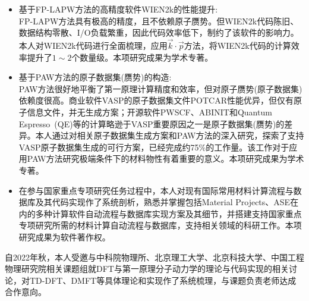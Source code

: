 \begin{itemize}
	\item 基于\textrm{FP-LAPW}方法的高精度软件\textrm{WIEN2k}的性能提升:\\
		\textrm{FP-LAPW}方法具有极高的精度，且不依赖原子赝势。但\textrm{WIEN2k}代码陈旧、数据结构零散、\textrm{I/O}负载繁重，因此代码效率低下，制约了该软件的影响力。本人对\textrm{WIEN2k}代码进行全面梳理，应用$\vec k\cdot\vec p$方法，将\textrm{WIEN2k}代码的计算效率提升了$1\sim2$个数量级。本项研究成果为学术专著。
	\item 基于\textrm{PAW}方法的原子数据集(赝势)的构造:\\
		\textrm{PAW}方法很好地平衡了第一原理计算精度和效率，但对原子赝势(原子数据集)依赖度很高。商业软件\textrm{VASP}的原子数据集文件\textrm{POTCAR}性能优异，但仅有原子信息文件，并无生成方案；开源软件\textrm{PWSCF}、\textrm{ABINIT}和\textrm{Quantum Espresso~(QE)}等的计算略逊于\textrm{VASP}重要原因之一是原子数据集(赝势)的差异。本人通过对相关原子数据集生成方案和\textrm{PAW}方法的深入研究，探索了支持\textrm{VASP}原子数据集生成的可行方案，已经完成约75\%的工作量。该工作对于应用\textrm{PAW}方法研究极端条件下的材料物性有着重要的意义。本项研究成果为学术专著。

	\item 在参与国家重点专项研究任务过程中，本人对现有国际常用材料计算流程与数据库及其代码实现作了系统剖析，熟悉并掌握包括\textrm{Material Projects}、\textrm{ASE}在内的多种计算软件自动流程与数据库实现方案及其细节，并搭建支持国家重点专项研究所需的材料计算自动流程与数据库，支持相关领域的科研工作。本项研究成果为软件著作权。


\end{itemize}
	自\textrm{2022}年秋，本人受邀与中科院物理所、北京理工大学、北京科技大学、中国工程物理研究院相关课题组就\textrm{DFT}与第一原理分子动力学的理论与代码实现的相关讨论，对\textrm{TD-DFT}、\textrm{DMFT}等具体理论和实现作了系统梳理，与课题负责老师达成合作意向。
